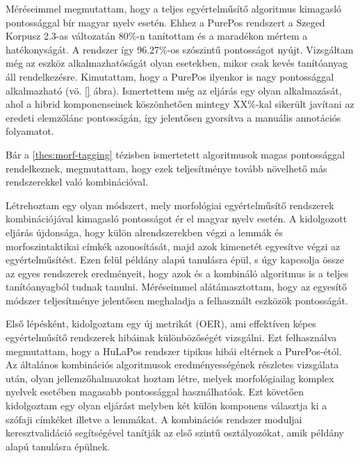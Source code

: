 \begin{center}
\end{center}

Méréseimmel megmutattam, hogy a teljes egyértelműsítő algoritmus kimagasló pontossággal bír magyar nyelv esetén. 
Ehhez a PurePos rendszert a Szeged Korpusz 2.3-as változatán 80\%-n tanítottam és a maradékon mértem a hatékonyságát. 
A rendszer így 96.27\%-os szószintű pontosságot nyújt.
Vizsgáltam még az eszköz alkalmazhatóságát olyan esetekben, mikor csak kevés tanítóanyag áll rendelkezésre.
Kimutattam, hogy a PurePos ilyenkor is nagy pontossággal alkalmazható (vö. \ref{} ábra). 
Ismertettem még az eljárás egy olyan alkalmazását, ahol a hibrid komponenseinek köszönhetően mintegy XX\%-kal sikerült javítani az eredeti elemzőlánc pontosságán, így jelentősen gyorsítva a manuális annotációs folyamatot.


\thesisline%


Bár a \ref{thes:morf-tagging} tézisben ismertetett algoritmusok magas pontossággal rendelkeznek, megmutattam, hogy ezek teljesítménye tovább növelhető más rendszerekkel való kombinációval. 

\begin{core}
\begin{thesis}
Létrehoztam egy olyan módszert, mely morfológiai egyértelműsítő rendszerek kombinációjával kimagasló pontosságot ér el magyar nyelv esetén.
A kidolgozott eljárás újdonsága, hogy külön alrendszerekben végzi a lemmák és morfoszintaktikai címkék azonosítását, majd azok kimenetét egyesítve végzi az egyértelműsítést.
Ezen felül példány alapú tanulásra épül, s úgy kapcsolja össze az egyes rendszerek eredményeit, hogy azok és a kombináló algoritmus is a teljes tanítóanyagból tudnak tanulni. 
Méréseimmel alátámasztottam, hogy az egyesítő módszer teljesítménye jelentősen meghaladja a felhasznált eszközök pontosságát. 
\end{thesis}

\begin{pub}
\cite{Laki2013a,Orosz2013c,Orosz2013d} 
\end{pub}
\end{core}

Első lépésként, kidolgoztam egy új metrikát (OER), ami effektíven képes egyértelműsítő rendszerek hibáinak különbözőségét vizsgálni. 
Ezt felhasználva megmutattam, hogy a HuLaPos rendszer tipikus hibái eltérnek a PurePos-étól. 
Az általános kombinációs algoritmusok eredményességének részletes vizsgálata után, olyan jellemzőhalmazokat hoztam létre, melyek morfológiailag komplex nyelvek esetében magasabb pontossággal használhatóak.
Ezt követően kidolgoztam egy olyan eljárást melyben két külön komponens választja ki a szófaji címkéket illetve a lemmákat. 
A kombinációs rendszer moduljai keresztvalidáció segítségével tanítják az első szintű osztályozókat, amik példány alapú tanulásra épülnek.

